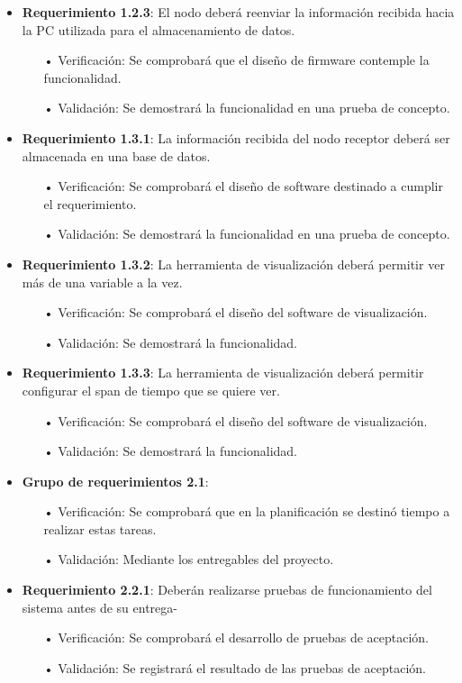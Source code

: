 \documentclass[11pt]{charter}
\begin{document}
\begin{itemize}
\item \textbf{Requerimiento 1.2.3}: El nodo deberá reenviar la información recibida hacia la PC utilizada para el almacenamiento de datos.
\begin{itemize}
\item[•] Verificación: Se comprobará que el diseño de firmware contemple la funcionalidad.
\item[•] Validación: Se demostrará la funcionalidad en una prueba de concepto.
\end{itemize}

\item \textbf{Requerimiento 1.3.1}: La información recibida del nodo receptor deberá ser almacenada en una base de datos.
\begin{itemize}
\item[•] Verificación: Se comprobará el diseño de software destinado a cumplir el requerimiento.
\item[•] Validación: Se demostrará la funcionalidad en una prueba de concepto.
\end{itemize}

\item \textbf{Requerimiento 1.3.2}: La herramienta de visualización deberá permitir ver más de una variable a la vez.
\begin{itemize}
\item[•] Verificación: Se comprobará el diseño del software de visualización.
\item[•] Validación: Se demostrará la funcionalidad.
\end{itemize}

\item \textbf{Requerimiento 1.3.3}: La herramienta de visualización deberá permitir configurar el span de tiempo que se quiere ver.
\begin{itemize}
\item[•] Verificación: Se comprobará el diseño del software de visualización.
\item[•] Validación: Se demostrará la funcionalidad.
\end{itemize}


\item \textbf{Grupo de requerimientos 2.1}:
\begin{itemize}
\item[•] Verificación: Se comprobará que en la planificación se destinó tiempo a realizar estas tareas.
\item[•] Validación: Mediante los entregables del proyecto.
\end{itemize}

\item \textbf{Requerimiento 2.2.1}: Deberán realizarse pruebas de funcionamiento del sistema antes de su entrega-
\begin{itemize}
\item[•] Verificación: Se comprobará el desarrollo de pruebas de aceptación.
\item[•] Validación: Se registrará el resultado de las pruebas de aceptación.
\end{itemize}

\end{itemize}
\end{document}
